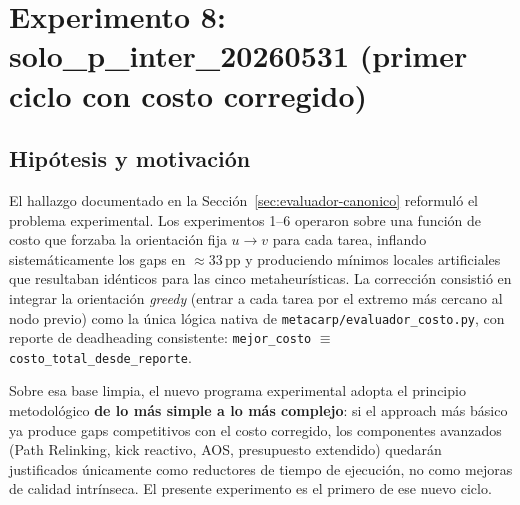 
\providecommand{\TODO}[1]{\textcolor{rojomalo}{\textbf{[TODO: #1]}}}

\section{Experimento 8: solo\_p\_inter\_20260531 (primer ciclo con costo corregido)}
\label{sec:exp-solo-p-inter}

\subsection{Hipótesis y motivación}

El hallazgo documentado en la Sección~\ref{sec:evaluador-canonico}
reformuló el problema experimental. Los experimentos 1--6 operaron
sobre una función de costo que forzaba la orientación fija $u \to v$
para cada tarea, inflando sistemáticamente los gaps en $\approx 33$\,pp
y produciendo mínimos locales artificiales que resultaban idénticos
para las cinco metaheurísticas. La corrección consistió en integrar la
orientación \emph{greedy} (entrar a cada tarea por el extremo más
cercano al nodo previo) como la única lógica nativa de
\texttt{metacarp/evaluador\_costo.py}, con reporte de deadheading
consistente: \texttt{mejor\_costo} $\equiv$ \texttt{costo\_total\_desde\_reporte}.

Sobre esa base limpia, el nuevo programa experimental adopta el
principio metodológico \textbf{de lo más simple a lo más complejo}:
si el approach más básico ya produce gaps competitivos con el costo
corregido, los componentes avanzados (Path Relinking, kick reactivo,
AOS, presupuesto extendido) quedarán justificados únicamente como
reductores de tiempo de ejecución, no como mejoras de calidad
intrínseca. El presente experimento es el primero de ese nuevo ciclo.

